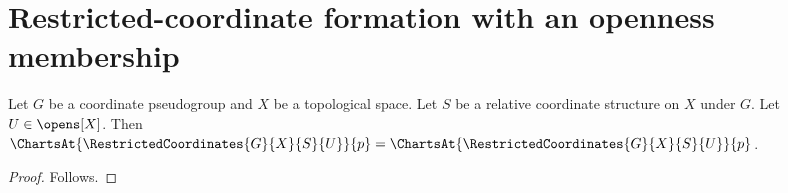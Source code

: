\section{Restricted-coordinate formation with an openness membership}



\begin{theorem}\label{membership_restricted_charts_at}
    Let $G$ be a coordinate pseudogroup and $X$ be a topological space.
    Let $S$ be a relative coordinate structure on $X$ under $G$.
    Let $U\in\opens[X]$.
    Then $\ChartsAt{\RestrictedCoordinates{G}{X}{S}{U}}{p}
        =\ChartsAt{\RestrictedCoordinates{G}{X}{S}{U}}{p}$.
\end{theorem}
\begin{proof}
    Follows.
\end{proof}
